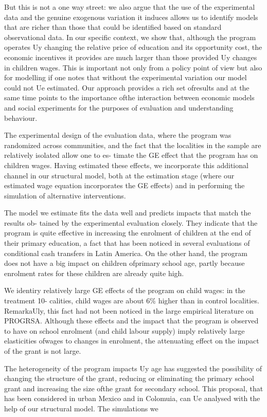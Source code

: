 But this is not a one way street: we also argue that the use of the experimental data and the genuine exogenous variation it induces allows us to identify models that are richer than those that could be identified based on standard observational data. In our specific context, we show that, although the program operates Uy changing the relative price of education and its opportunity cost, the economic incentives it provides are much larger than those provided Uy changes in children wages. This is important not only from a policy point of view but also for modelling if one notes that without the experimental variation our model could not Ue estimated. Our approach provides a rich set ofresults and at the same time points to the importance ofthe interaction between economic models and social experiments for the purposes of evaluation and understanding behaviour.

The experimental design of the evaluation data, where the program was randomized across communities, and the fact that the localities in the sample are relatively isolated allow one to es- timate the GE effect that the program has on children wages. Having estimated these effects, we incorporate this additional channel in our structural model, both at the estimation stage (where our estimated wage equation incorporates the GE effects) and in performing the simulation of alternative interventions.

The model we estimate fits the data well and predicts impacts that match the results ob- tained by the experimental evaluation closely. They indicate that the program is quite effective in increasing the enrolment of children at the end of their primary education, a fact that has been noticed in several evaluations of conditional cash transfers in Latin America. On the other hand, the program does not have a big impact on children ofprimary school age, partly because enrolment rates for these children are already quite high.

We identiry relatively large GE effects of the program on child wages: in the treatment 10- calities, child wages are about 6\% higher than in control localities. RemarkaUly, this fact had not been noticed in the large empirical literature on PROGRSA. Although these effects and the impact that the program is observed to have on school enrolment (and child labour supply) imply relatively large elasticities ofwages to changes in enrolment, the attenuating effect on the impact of the grant is not large.

The heterogeneity of the program impacts Uy age has suggested the possibility of changing the structure of the grant, reducing or eliminating the primary school grant and increasing the size ofthe grant for secondary school. This proposal, that has been considered in urban Mexico and in Colomuia, can Ue analysed with the help of our structural model. The simulations we

